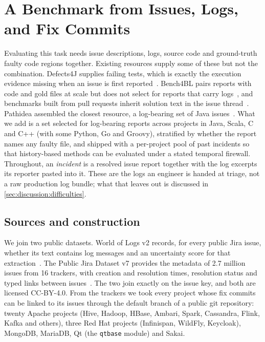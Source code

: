 \section{A Benchmark from Issues, Logs, and Fix Commits}
\label{sec:benchmark}

Evaluating this task needs issue descriptions, logs, source code and
ground-truth faulty code regions together. Existing resources supply
some of these but not the combination. Defects4J supplies failing
tests, which is exactly the execution evidence missing when an issue is
first reported~\cite{just2014defects4j}. Bench4BL pairs reports with
code and gold files at scale but does not select for reports that carry
logs~\cite{lee2018bench4bl}, and benchmarks built from pull requests
inherit solution text in the issue
thread~\cite{aleithan2024swebenchplus}. Pathidea assembled the closest
resource, a log-bearing set of Java issues~\cite{chen2022pathidea}.
What we add is a set selected for log-bearing reports across
\nProjects{} projects in Java, Scala, C and C++ (with some Python, Go
and Groovy), stratified by whether the
report names any faulty file, and shipped with a per-project pool of
past incidents so that history-based methods can be evaluated under a
stated temporal firewall. Throughout, an \emph{incident} is a resolved
issue report together with the log excerpts its reporter pasted into
it. These are the logs an engineer is handed at triage, not a raw
production log bundle; what that leaves out is discussed in
\cref{sec:discussion:difficulties}.

\subsection{Sources and construction}
\label{sec:benchmark:linkage}

We join two public datasets. World of Logs v2 records, for every public
Jira issue, whether its text contains log messages and an uncertainty
score for that extraction~\cite{wang2026wol}. The Public Jira Dataset v7
provides the metadata of 2.7 million issues from 16 trackers, with
creation and resolution times, resolution status and typed links
between issues~\cite{montgomery2022jira}. The two join exactly on the
issue key, and both are licensed CC-BY-4.0. From the trackers we took
every project whose fix commits can be linked to its issues through the
default branch of a public git repository: twenty Apache projects (Hive,
Hadoop, HBase, Ambari, Spark, Cassandra, Flink, Kafka and others), three
Red Hat projects (Infinispan, WildFly, Keycloak), MongoDB, MariaDB, Qt
(the \texttt{qtbase} module) and Sakai.

